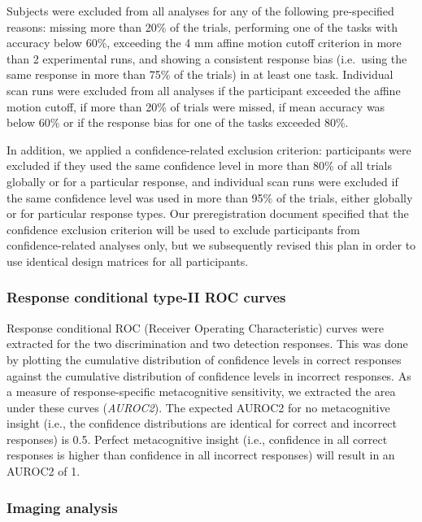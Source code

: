 \documentclass[12pt,twoside]{reedthesis}
\begin{document}
Subjects were excluded from all analyses for any of the following pre-specified reasons: missing more than 20\% of the trials, performing one of the tasks with accuracy below 60\%, exceeding the 4 mm affine motion cutoff criterion in more than 2 experimental runs, and showing a consistent response bias (i.e.~using the same response in more than 75\% of the trials) in at least one task. Individual scan runs were excluded from all analyses if the participant exceeded the affine motion cutoff, if more than 20\% of trials were missed, if mean accuracy was below 60\% or if the response bias for one of the tasks exceeded 80\%.

In addition, we applied a confidence-related exclusion criterion: participants were excluded if they used the same confidence level in more than 80\% of all trials globally or for a particular response, and individual scan runs were excluded if the same confidence level was used in more than 95\% of the trials, either globally or for particular response types. Our preregistration document specified that the confidence exclusion criterion will be used to exclude participants from confidence-related analyses only, but we subsequently revised this plan in order to use identical design matrices for all participants.

\hypertarget{response-conditional-type-ii-roc-curves}{%
\subsubsection{Response conditional type-II ROC curves}\label{response-conditional-type-ii-roc-curves}}

Response conditional ROC (Receiver Operating Characteristic) curves were extracted for the two discrimination and two detection responses. This was done by plotting the cumulative distribution of confidence levels in correct responses against the cumulative distribution of confidence levels in incorrect responses. As a measure of response-specific metacognitive sensitivity, we extracted the area under these curves (\emph{AUROC2}). The expected AUROC2 for no metacognitive insight (i.e., the confidence distributions are identical for correct and incorrect responses) is 0.5. Perfect metacognitive insight (i.e., confidence in all correct responses is higher than confidence in all incorrect responses) will result in an AUROC2 of 1.

\hypertarget{imaging-analysis}{%
\subsubsection{Imaging analysis}\label{imaging-analysis}}
\end{document}
